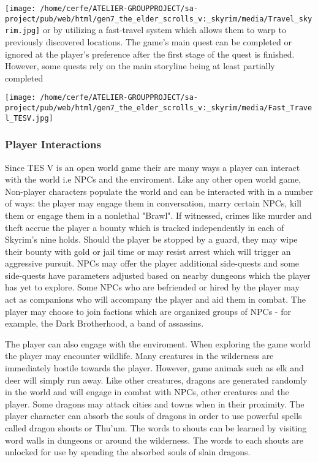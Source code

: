 \documentclass[a4paper,10pt]{book}
\begin{document}
 
 \texttt{[image: /home/cerfe/ATELIER-GROUPPROJECT/sa-project/pub/web/html/gen7\_the\_elder\_scrolls\_v:\_skyrim/media/Travel\_skyrim.jpg]}  
  or by utilizing a fast-travel system which allows them to warp to previously discovered locations. The game's main quest can be completed or ignored at the player's preference after the first stage of the quest is finished. However, some quests rely on the main storyline being at least partially completed
         
 \texttt{[image: /home/cerfe/ATELIER-GROUPPROJECT/sa-project/pub/web/html/gen7\_the\_elder\_scrolls\_v:\_skyrim/media/Fast\_Travel\_TESV.jpg]}
 
 \subsubsection{Player Interactions }
 
          Since TES V is an open world game their are many ways a player can interact with the world i.e NPCs and the enviroment. Like any other open world game,
           Non-player characters populate the world and can be interacted with in a number of ways: the player may engage them in conversation, marry certain NPCs, kill them or engage them in a nonlethal "Brawl".
          If witnessed, crimes like murder and theft accrue the player a bounty which is tracked independently in each of Skyrim's nine holds.
          Should the player be stopped by a guard, they may wipe their bounty with gold or jail time or may resist arrest which will trigger an aggressive pursuit.
          NPCs may offer the player additional side-quests and some side-quests have parameters adjusted based on nearby dungeons which the player has yet to explore.
          Some NPCs who are befriended or hired by the player may act as companions who will accompany the player and aid them in combat.
          The player may choose to join factions which are organized groups of NPCs - for example, the Dark Brotherhood, a band of assassins.
         
 
 
          The player can also engage with the enviroment. When exploring the game world the player may encounter wildlife. Many creatures in the wilderness are immediately hostile towards the player. However, game animals such as elk and deer will simply run away.
           Like other creatures, dragons are generated randomly in the world and will engage in combat with NPCs, other creatures and the player. Some dragons may attack cities and towns when in their proximity.
           The player character can absorb the souls of dragons in order to use powerful spells called dragon shouts or Thu'um. The words to shouts can be learned by visiting word walls in dungeons or around the wilderness.
          The words to each shouts are unlocked for use by spending the absorbed souls of slain dragons.
         
\end{document}
